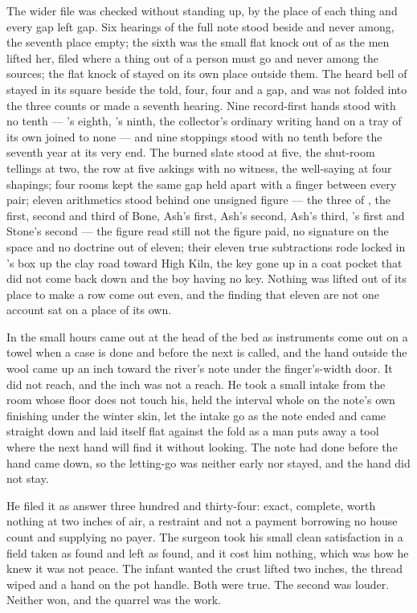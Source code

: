 The wider file was checked without standing up, by the place of each thing and every gap left gap. Six hearings of the full note stood beside and never among, the seventh place empty; the sixth was the small flat knock out of  as the men lifted her, filed where a thing out of a person must go and never among the sources; the flat knock of  stayed on its own place outside them. The heard bell of  stayed in its square beside the told, four, four and a gap, and was not folded into the three counts or made a seventh hearing. Nine record-first hands stood with no tenth — 's eighth, 's ninth, the collector's ordinary writing hand on a tray of its own joined to none — and nine stoppings stood with no tenth before the seventh year at its very end. The burned slate stood at five, the shut-room tellings at two, the row at five askings with no witness, the well-saying at four shapings; four rooms kept the same gap held apart with a finger between every pair; eleven arithmetics stood behind one unsigned figure — the three of , the first, second and third of Bone, Ash's first, Ash's second, Ash's third, 's first and Stone's second — the figure read still not the figure paid, no signature on the space and no doctrine out of eleven; their eleven true subtractions rode locked in 's box up the clay road toward High Kiln, the key gone up in a coat pocket that did not come back down and the boy having no key. Nothing was lifted out of its place to make a row come out even, and the finding that eleven are not one account sat on a place of its own.

In the small hours  came out at the head of the bed as instruments come out on a towel when a case is done and before the next is called, and the hand outside the wool came up an inch toward the river's note under the finger's-width door. It did not reach, and the inch was not a reach. He took a small intake from the room whose floor does not touch his, held the interval whole on the note's own finishing under the winter skin, let the intake go as the note ended and came straight down and laid itself flat against the fold as a man puts away a tool where the next hand will find it without looking. The note had done before the hand came down, so the letting-go was neither early nor stayed, and the hand did not stay.

He filed it as answer three hundred and thirty-four: exact, complete, worth nothing at two inches of air, a restraint and not a payment borrowing no house count and supplying no payer. The surgeon took his small clean satisfaction in a field taken as found and left as found, and it cost him nothing, which was how he knew it was not peace. The infant wanted the crust lifted two inches, the thread wiped and a hand on the pot handle. Both were true. The second was louder. Neither won, and the quarrel was the work.

